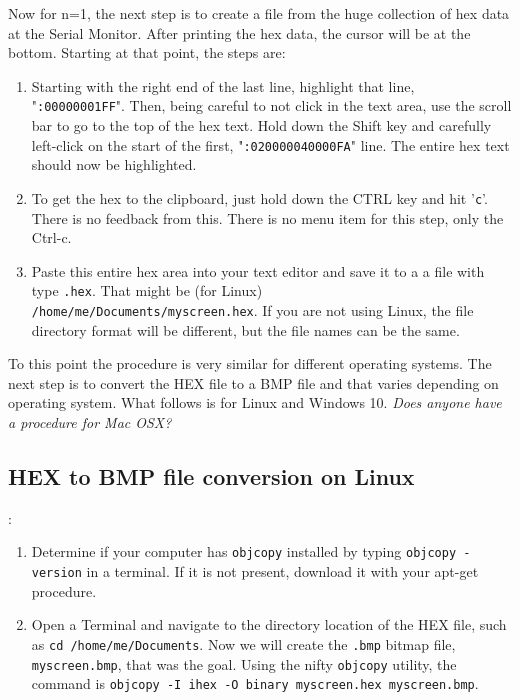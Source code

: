\begin{description}
Now for n=1, the next step is to create a file from the huge collection of hex data at the Serial Monitor.  After printing the hex data, the cursor will be at the bottom.  Starting at that point, the steps are:
\begin{enumerate}

\item Starting with the right end of the last line, highlight that line, "\texttt{:00000001FF}". Then, being careful to not click in the text area, use the scroll bar to go to the top of the hex text. Hold down the Shift key and carefully left-click on the start of the first, "\texttt{:020000040000FA}" line. The entire hex text should now be highlighted.

\item To get the hex to the clipboard, just hold down the CTRL key and hit '\texttt{c}'. There is no feedback from this. There is no menu item for this step, only the Ctrl-c.

\item Paste this entire hex area into your text editor and save it to a a file with type \texttt{.hex}. That might be (for Linux) \\ \texttt{/home/me/Documents/myscreen.hex}.  If you are not using Linux, the file directory format will be different, but the file names can be the same.
\end{enumerate}

To this point the procedure is very similar for different operating systems.  The next step is to convert the HEX file to a BMP file and that varies depending on operating system.   What follows is for Linux and Windows 10.  \textit{Does anyone have a procedure for Mac OSX?}

\subsection{HEX to BMP file conversion on Linux}:
\begin{enumerate}
\item Determine if your computer has \texttt{objcopy} installed by typing \texttt{objcopy -version} in a terminal.  If it is not present, download it with your apt-get procedure.

\item Open a Terminal and navigate to the directory location of the HEX file, such as \texttt{cd /home/me/Documents}.  Now we will create the \texttt{.bmp} bitmap file, \texttt{myscreen.bmp}, that was the goal.  Using the nifty \texttt{objcopy} utility, the command is \texttt{objcopy -I ihex -O binary myscreen.hex myscreen.bmp}.


\end{enumerate}
\end{description}
